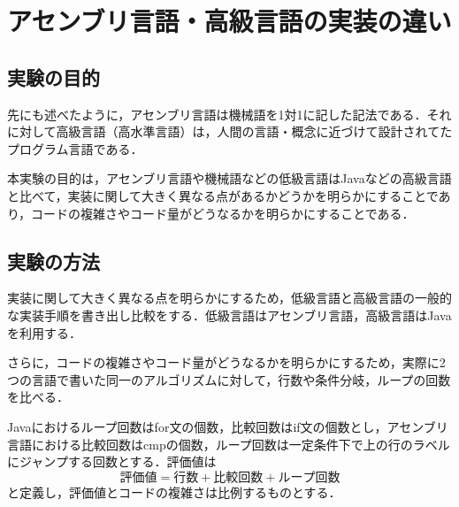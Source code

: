 \chapter{アセンブリ言語・高級言語の実装の違い}
\section{実験の目的}
先にも述べたように，アセンブリ言語は機械語を1対1に記した記法である．それに対して高級言語（高水準言語）は，人間の言語・概念に近づけて設計されてたプログラム言語である．\cite{高水準言語}\par
本実験の目的は，アセンブリ言語や機械語などの低級言語は{\ttfamily Java}などの高級言語と比べて，実装に関して大きく異なる点があるかどうかを明らかにすることであり，コードの複雑さやコード量がどうなるかを明らかにすることである．
\section{実験の方法}
実装に関して大きく異なる点を明らかにするため，低級言語と高級言語の一般的な実装手順を書き出し比較をする．低級言語はアセンブリ言語，高級言語は{\ttfamily Java}を利用する．\par
さらに，コードの複雑さやコード量がどうなるかを明らかにするため，実際に2つの言語で書いた同一のアルゴリズムに対して，行数や条件分岐，ループの回数を比べる．\par
{\ttfamily Java}におけるループ回数は{\ttfamily for}文の個数，比較回数は{\ttfamily if}文の個数とし，アセンブリ言語における比較回数は{\ttfamily cmp}の個数，ループ回数は一定条件下で上の行のラベルにジャンプする回数とする．評価値は
\[評価値=行数+比較回数+ループ回数\]と定義し，評価値とコードの複雑さは比例するものとする．
